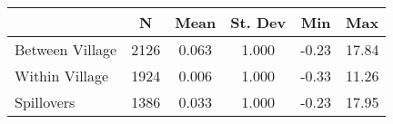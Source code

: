 \begin{tabular}{l*{5}{c}}\hline&\multicolumn{1}{c}{N}&\multicolumn{1}{c}{Mean}&\multicolumn{1}{c}{St. Dev}&\multicolumn{1}{c}{Min}&\multicolumn{1}{c}{Max}\\ \hline 
Between Village & 2126 & 0.063 & 1.000 & -0.23 & 17.84 \\
Within Village & 1924 & 0.006 & 1.000 & -0.33 & 11.26 \\
Spillovers & 1386 & 0.033 & 1.000 & -0.23 & 17.95 \\
\hline \end{tabular}
